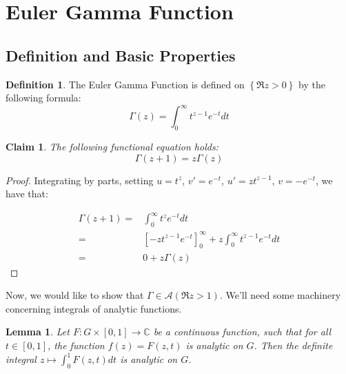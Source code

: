 \documentclass[11pt]{article} %
\newtheorem{lemma}[theorem]{Lemma}
\newtheorem{claim}[theorem]{Claim}
\theoremstyle{definition}
\newtheorem{definition}[theorem]{Definition}
\theoremstyle{remark}
\begin{document}
\section{Euler Gamma Function}

\subsection{Definition and Basic Properties}

\begin{definition}
The Euler Gamma Function is defined on $\left\{\Re z > 0\right\}$ by the following formula:
\[ \Gamma \left(z\right) = \int_0^\infty t^{z-1}e^{-t}dt \]
\end{definition}

\begin{claim}
The following functional equation holds:
\[ \Gamma \left(z+1\right) = z \Gamma\left(z\right) \]
\end{claim}

\begin{proof}
Integrating by parts, setting $u = t^z$, $v' = e^{-t}$, $u' = zt^{z-1}$, $v = -e^{-t}$, we have that:

\[
\begin{split}
\Gamma\left(z+1\right) = & \int_0^\infty t^z e^{-t}dt \\
= & \left[-zt^{z-1}e^{-t}\right]_0^\infty + z\int_0^\infty t^{z-1}e^{-t}dt \\
= & 0 + z\Gamma\left(z\right)
\end{split}
\]
\end{proof}

Now, we would like to show that $\Gamma \in \mathcal{A}\left(\Re z > 1\right)$. We'll need some machinery concerning integrals of analytic functions.

\begin{lemma}
Let $F : G \times \left[0,1\right] \to \mathbb{C}$ be a continuous function, such that for all $t \in \left[0,1\right]$, the function $f\left(z\right) = F\left(z,t\right)$ is analytic on $G$. Then the definite integral $z \mapsto \int_0^1 F\left(z,t\right)dt$ is analytic on $G$.
\end{lemma}
\end{document}
